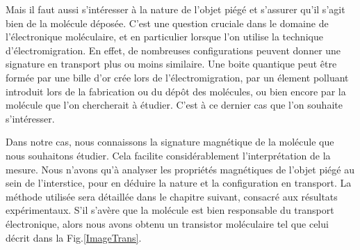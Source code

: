 Mais il faut aussi s'intéresser à la nature de l'objet piégé et s'assurer qu'il s'agit bien de la molécule déposée. C'est une question cruciale dans le domaine de l'électronique moléculaire, et en particulier lorsque l'on utilise la technique d'électromigration. En effet, de nombreuses configurations peuvent donner une signature en transport plus ou moins similaire. Une boite quantique peut \^etre formée par une bille d'or crée lors de l'électromigration, par un élement polluant introduit lors de la fabrication ou du dép\^ot des molécules, ou bien encore par la molécule que l'on chercherait à étudier. C'est à ce dernier cas que l'on souhaite s'intéresser.

Dans notre cas, nous connaissons la signature magnétique de la molécule que nous souhaitons étudier. Cela facilite considérablement l'interprétation de la mesure. Nous n'avons qu'à analyser les propriétés magnétiques de l'objet piégé au sein de l'interstice, pour en déduire la nature et la configuration en transport. La méthode utilisée sera détaillée dans le chapitre suivant, consacré aux résultats expérimentaux.  S'il s'avère que la molécule est bien responsable du transport électronique, alors nous avons obtenu un transistor moléculaire tel que celui décrit dans la Fig.\ref{ImageTrans}.



